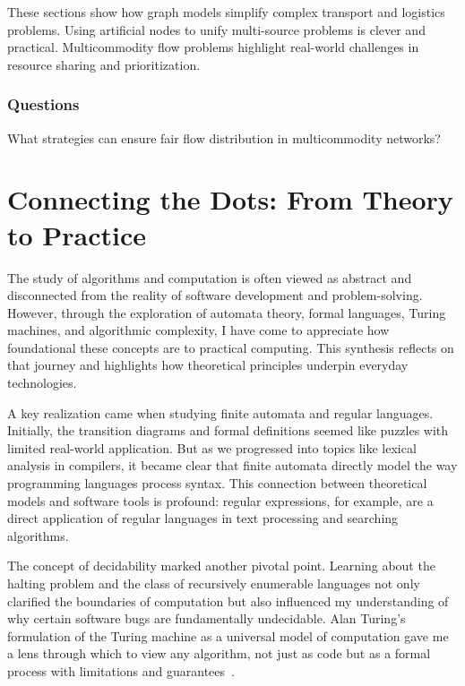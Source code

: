 \documentclass{article}
\theoremstyle{theorem}
\theoremstyle{definition}
\theoremstyle{remark}
\begin{document}
These sections show how graph models simplify complex transport and logistics problems. Using artificial nodes to unify multi-source problems is clever and practical. Multicommodity flow problems highlight real-world challenges in resource sharing and prioritization.

\subsubsection{Questions}

What strategies can ensure fair flow distribution in multicommodity networks?



\section{Connecting the Dots: From Theory to Practice}

The study of algorithms and computation is often viewed as abstract and disconnected from the reality of software development and problem-solving. However, through the exploration of automata theory, formal languages, Turing machines, and algorithmic complexity, I have come to appreciate how foundational these concepts are to practical computing. This synthesis reflects on that journey and highlights how theoretical principles underpin everyday technologies.

A key realization came when studying finite automata and regular languages. Initially, the transition diagrams and formal definitions seemed like puzzles with limited real-world application. But as we progressed into topics like lexical analysis in compilers, it became clear that finite automata directly model the way programming languages process syntax. This connection between theoretical models and software tools is profound: regular expressions, for example, are a direct application of regular languages in text processing and searching algorithms.

The concept of decidability marked another pivotal point. Learning about the halting problem and the class of recursively enumerable languages not only clarified the boundaries of computation but also influenced my understanding of why certain software bugs are fundamentally undecidable. Alan Turing's formulation of the Turing machine as a universal model of computation gave me a lens through which to view any algorithm, not just as code but as a formal process with limitations and guarantees~\cite{turing1937}.
\end{document}
